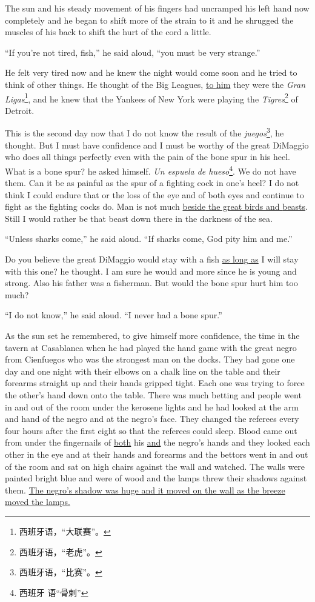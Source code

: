 The sun and his steady movement of his fingers had uncramped his left hand
now completely and he began to shift more of the strain to it and he
\gls{shrugged} the \glspl{muscle} of his back to shift the hurt of the cord
a little.

``If you're not tired, fish,'' he said aloud, ``you must be very strange.''

He felt very tired now and he knew the night would come soon and he tried to
think of other things. He thought of the Big Leagues, \uline{to him} they were the
\emph{Gran Ligas}\footnote{西班牙语，“大联赛”。}, and he knew that the
Yankees of New York were playing the \emph{Tigres}\footnote{西班牙语，“老虎”。} of Detroit.

This is the second day now that I do not know the result of the
\emph{juegos}\footnote{西班牙语，“比赛”。}, he thought. But I must have
confidence and I must be worthy of the great DiMaggio who does all things
perfectly even with the pain of the bone \gls{spur} in his \gls{heel}. What
is a bone spur? he asked himself. \emph{Un espuela de hueso}\footnote{西班牙
  语“骨刺”}. We do not have them. Can it be as painful as the spur of a
fighting cock in one's heel? I do not think I could endure that or the loss
of the eye and of both eyes and continue to fight as the fighting cocks do.
Man is not much \uline{\gls{beside} the great birds and \glspl{beast}}.
Still I would rather be that beast down there in the darkness of the sea.

``Unless sharks come,'' he said aloud. ``If sharks come, God pity him and me.''

Do you believe the great DiMaggio would stay with a fish \uline{as long as} I will
stay with this one? he thought. I am sure he would and more since he is
young and strong. Also his father was a fisherman. But would the bone spur
hurt him too much?

``I do not know,'' he said aloud. ``I never had a bone spur.''

As the sun set he remembered, to give himself more confidence, the time in
the \gls{tavern} at \gls{Casablanca} when he had played the hand game with
the great \gls{negro} from \gls{Cienfuegos} who was the strongest man on the
\glspl{dock}. They had gone one day and one night with their \glspl{elbow}
on a \gls{chalk} line on the table and their forearms straight up and their
hands gripped tight. Each one was trying to force the other's hand down onto
the table. There was much \gls{betting} and people went in and out of the
room under the \gls{kerosene} lights and he had looked at the arm and hand
of the negro and at the negro's face. They changed the \glspl{referee} every
four hours after the first eight so that the referees could sleep. Blood
came out from under the \glspl{fingernail} of \uline{both} his \uline{and}
the negro's hands and they looked each other in the eye and at their hands
and forearms and the \glspl{bettor} went in and out of the room and sat on
high chairs against the wall and watched. The walls were painted bright blue
and were of wood and the lamps \gls{threw} their shadows against them. \uline{The
negro's shadow was huge and it moved on the wall as the breeze moved the
lamps.}

